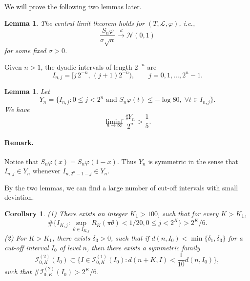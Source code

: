 \documentclass{amsart}
\newtheorem{lemm}[thm]{Lemma}
\newtheorem{cor}[thm]{Corollary}
\theoremstyle{definition}
\begin{document}
We will prove the following two lemmas later.

\begin{lemm}\label{clt}
The central limit theorem holds for $(T,\mathcal{L},\varphi)$, i.e., 
$$\frac{S_n \varphi}{\sigma\sqrt{n}}\overset{d}\longrightarrow \mathscr{N}(0,1)$$
for some fixed $\sigma>0$.
\end{lemm}

Given $n>1$, the dyadic intervals of length $2^{-n}$ are
\[
I_{n,j}=\bigl[j\,2^{-n},\,(j+1)2^{-n}\bigr),\qquad j=0,1,\dots,2^n-1.
\]

\begin{lemm}\label{discrete}
Let
$$Y_n=\{I_{n,j} : 0\le j<2^n \mbox{ and } S_n \varphi(t)\le-\log 80,\; \forall t\in I_{n,j} \}.$$
We have
$$\liminf_{n\to\infty}\frac{\sharp Y_n}{2^n}>\frac{1}{5}.$$
\end{lemm}
\paragraph{\textbf{Remark.}} Notice that $S_n\varphi(x)=S_n\varphi(1-x)$. 
Thus $Y_n$ is symmetric in the sense that
 $I_{n,j}\in Y_n$ whenever $I_{n,2^n-1-j}\in Y_n$. 
 
 
 By the two lemmas, we can find a large number of cut-off intervals with small deviation.
 
 \begin{cor}
\label{1924}
(1) There exists an integer $K_1>100$, such that for every $K>K_1$, 
\begin{equation}
\label{1/20}
\#\{I_{K,j}:\sup_{\theta\in I_{K,j}}R_K(\pi\theta)<1/20, 0\le j<2^K\}>2^K/6.
\end{equation}
(2) For $K>K_1$, there exists $\delta_3>0$, such that if $d(n,I_0)<\min\{\delta_1,\delta_3\}$
for a cut-off interval $I_0$ of level $n$, then there exists a symmetric family
\begin{equation*}
\mathcal{I}_{0,K}^{(2)}(I_0)\subset\{I\in\mathcal{I}_{0,K}^{(1)}(I_0):
d(n+K,I)<\frac{1}{10}d(n,I_0)\},
\end{equation*}
such that $\#\mathcal{I}_{0,K}^{(2)}(I_0)>2^K/6$.
\end{cor}
\end{document}
